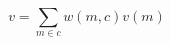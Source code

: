 \documentclass[preview]{standalone}
\begin{document}
\[v = \sum_{m \in c} w(m, c)v(m)\]
\end{document}
